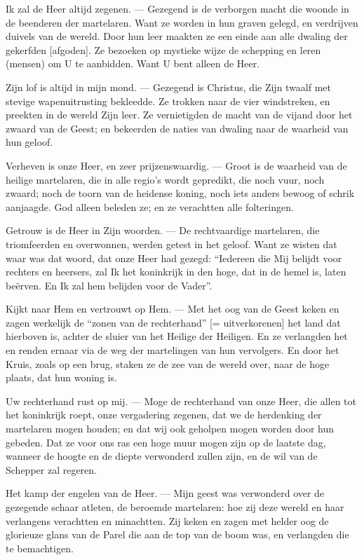 \documentclass[12pt,twoside,a5paper]{article}
\begin{document}
\begin{halfparskip}
   Ik zal de Heer altijd zegenen. --- Gezegend is de verborgen macht die woonde in de beenderen der martelaren. Want ze worden in hun graven gelegd, en verdrijven duivels van de wereld. Door hun leer maakten ze een einde aan alle dwaling der gekerfden [afgoden]. Ze bezoeken op mystieke wijze de schepping en leren (mensen) om U te aanbidden. Want U bent alleen de Heer.

  Zijn lof is altijd in mijn mond. --- Gezegend is Christus, die Zijn twaalf met stevige wapenuitrusting bekleedde. Ze trokken naar de vier windstreken, en preekten in de wereld Zijn leer. Ze vernietigden de macht van de vijand door het zwaard van de Geest; en bekeerden de naties van dwaling naar de waarheid van hun geloof.

  Verheven is onze Heer, en zeer prijzenswaardig. --- Groot is de waarheid van de heilige martelaren, die in alle regio's wordt gepredikt, die noch vuur, noch zwaard; noch de toorn van de heidense koning, noch iets anders bewoog of schrik aanjaagde. God alleen beleden ze; en ze verachtten alle folteringen.

  Getrouw is de Heer in Zijn woorden. --- De rechtvaardige martelaren, die triomfeerden en overwonnen, werden getest in het geloof. Want ze wisten dat waar was dat woord, dat onze Heer had gezegd: ``Iedereen die Mij belijdt voor rechters en heersers, zal Ik het koninkrijk in den hoge, dat in de hemel is, laten beërven. En Ik zal hem belijden voor de Vader''.

  Kijkt naar Hem en vertrouwt op Hem. --- Met het oog van de Geest keken en zagen werkelijk de ``zonen van de rechterhand'' [= uitverkorenen] het land dat hierboven is, achter de sluier van het Heilige der Heiligen. En ze verlangden het en renden ernaar via de weg der martelingen van hun vervolgers. En door het Kruis, zoals op een brug, staken ze de zee van de wereld over, naar de hoge plaats, dat hun woning is.

  Uw rechterhand rust op mij. --- Moge de rechterhand van onze Heer, die allen tot het koninkrijk roept, onze vergadering zegenen, dat we de herdenking der martelaren mogen houden; en dat wij ook geholpen mogen worden door hun gebeden. Dat ze voor ons ras een hoge muur mogen zijn op de laatste dag, wanneer de hoogte en de diepte verwonderd zullen zijn, en de wil van de Schepper zal regeren.

  Het kamp der engelen van de Heer. --- Mijn geest was verwonderd over de gezegende schaar atleten, de beroemde martelaren: hoe zij deze wereld en haar verlangens verachtten en minachtten. Zij keken en zagen met helder oog de glorieuze glans van de Parel die aan de top van de boom was, en verlangden die te bemachtigen.


\end{halfparskip}
\end{document}
